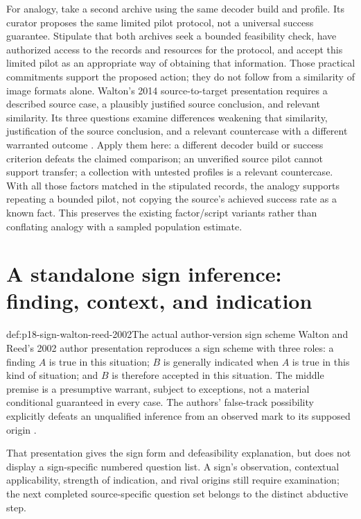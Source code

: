 For analogy, take a second archive using the same decoder build and profile.
Its curator proposes the same limited pilot protocol, not a universal success
guarantee. Stipulate that both archives seek a bounded feasibility check, have
authorized access to the records and resources for the protocol, and accept
this limited pilot as an appropriate way of obtaining that information.
Those practical commitments support the proposed action; they do not follow
from a similarity of image formats alone.
Walton's 2014 source-to-target presentation requires a described
source case, a plausibly justified source conclusion, and relevant similarity.
Its three questions examine differences weakening that similarity, justification
of the source conclusion, and a relevant countercase with a different warranted
outcome \parencite[author pp.~1--3]{Walton2014AnalogySchemes}.
Apply them here: a different decoder build or success criterion defeats the
claimed comparison; an unverified source pilot cannot support transfer; a
collection with untested profiles is a relevant countercase. With all those
factors matched in the stipulated records, the analogy supports repeating a
bounded pilot, not copying the source's achieved success rate as a known fact.
This preserves the existing factor/script variants rather than conflating
analogy with a sampled population estimate.

\section{A standalone sign inference: finding, context, and indication}
\label{sec:p18-sign-entry}

\begin{hbdefinition}{def:p18-sign-walton-reed-2002}{The actual author-version sign scheme}
Walton and Reed's 2002 author presentation reproduces a sign scheme with
three roles: a finding \(A\) is true in this situation; \(B\) is generally
indicated when \(A\) is true in this kind of situation; and \(B\) is
therefore accepted in this situation. The middle premise is a presumptive
warrant, subject to exceptions, not a material conditional guaranteed in every
case. The authors' false-track possibility explicitly defeats an unqualified
inference from an observed mark to its supposed origin
\parencite[author pp.~4--5]{WaltonReed2002DiagrammingAuthor}.
\end{hbdefinition}

That presentation gives the sign form and defeasibility explanation, but
does not display a sign-specific numbered question list. A sign's
observation, contextual applicability, strength of
indication, and rival origins still require examination; the next completed
source-specific question set belongs to the distinct abductive step.

